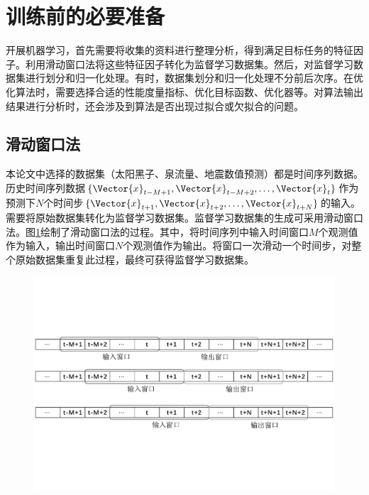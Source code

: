 \section{训练前的必要准备}\label{sec:ml_prepare}

开展机器学习，首先需要将收集的资料进行整理分析，得到满足目标任务的特征因子。利用滑动窗口法将这些特征因子转化为监督学习数据集。然后，对监督学习数据集进行划分和归一化处理。有时，数据集划分和归一化处理不分前后次序。在优化算法时，需要选择合适的性能度量指标、优化目标函数、优化器等。对算法输出结果进行分析时，还会涉及到算法是否出现过拟合或欠拟合的问题。

\subsection{滑动窗口法}\label{sec:ml_slide}

本论文中选择的数据集（太阳黑子、泉流量、地震数值预测）都是时间序列数据。历史时间序列数据$\{\Vector{x}_{t-M+1},\Vector{x}_{t-M+2},\ldots,\Vector{x}_{t}\}$作为预测下$N$个时间步$\{\Vector{x}_{t+1},\Vector{x}_{t+2},\ldots,\Vector{x}_{t+N}\}$的输入。需要将原始数据集转化为监督学习数据集。监督学习数据集的生成可采用滑动窗口法。图\ref{fig:slide_window}绘制了滑动窗口法的过程。其中，将时间序列中输入时间窗口$M$个观测值作为输入，输出时间窗口$N$个观测值作为输出。将窗口一次滑动一个时间步，对整个原始数据集重复此过程，最终可获得监督学习数据集。

\begin{figure}[!htbp]
  \centering
  \includegraphics[width=\textwidth]{Img/chap2_ml/slide_window.pdf}
  \label{fig:slide_window}
\end{figure}

